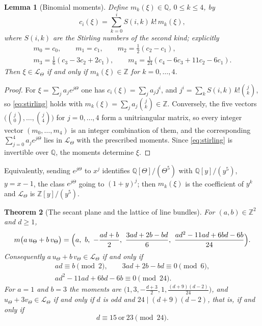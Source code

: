 \documentclass[11pt,reqno]{amsart}
\theoremstyle{plain}
\newtheorem{theorem}{Theorem}[section]
\newtheorem{lemma}[theorem]{Lemma}
\theoremstyle{definition}
\theoremstyle{remark}
\newcommand{\QQ}{\mathbb{Q}}
\newcommand{\ZZ}{\mathbb{Z}}
\newcommand{\cL}{\mathcal{L}}
\begin{document}
\begin{lemma}[Binomial moments]\label{lem:binomialmoments}
Define $m_{k}(\xi)\in\QQ$, $0\le k\le4$, by
\begin{equation}\label{eq:stirling}
  c_{i}(\xi)=\sum_{k=0}^{i}S(i,k)\,k!\,m_{k}(\xi),
\end{equation}
where $S(i,k)$ are the Stirling numbers of the second kind; explicitly
\begin{gather*}
  m_{0}=c_{0},\qquad m_{1}=c_{1},\qquad m_{2}=\tfrac12(c_{2}-c_{1}),\\
  m_{3}=\tfrac16(c_{3}-3c_{2}+2c_{1}),\qquad
  m_{4}=\tfrac1{24}(c_{4}-6c_{3}+11c_{2}-6c_{1}).
\end{gather*}
Then $\xi\in\cL_{\Theta}$ if and only if $m_{k}(\xi)\in\ZZ$ for $k=0,\dots,4$.
\end{lemma}

\begin{proof}
For $\xi=\sum_{j}a_{j}e^{j\Theta}$ one has $c_{i}(\xi)=\sum_{j}a_{j}j^{i}$,
and $j^{i}=\sum_{k}S(i,k)\,k!\binom{j}{k}$, so \eqref{eq:stirling} holds
with $m_{k}(\xi)=\sum_{j}a_{j}\binom{j}{k}\in\ZZ$. Conversely, the five
vectors $\bigl(\binom{j}{0},\dots,\binom{j}{4}\bigr)$ for $j=0,\dots,4$
form a unitriangular matrix, so every integer vector $(m_{0},\dots,m_{4})$
is an integer combination of them, and the corresponding
$\sum_{j=0}^{4}a_{j}e^{j\Theta}$ lies in $\cL_{\Theta}$ with the prescribed
moments. Since \eqref{eq:stirling} is invertible over $\QQ$, the moments
determine $\xi$.
\end{proof}

Equivalently, sending $e^{j\Theta}$ to $x^{j}$ identifies
$\QQ[\Theta]/(\Theta^{5})$ with $\QQ[y]/(y^{5})$, $y=x-1$, the class
$e^{j\Theta}$ going to $(1+y)^{j}$; then $m_{k}(\xi)$ is the coefficient of
$y^{k}$ and $\cL_{\Theta}$ is $\ZZ[y]/(y^{5})$.

\begin{theorem}[The secant plane and the lattice of line bundles]
\label{thm:lattice}
For $(a,b)\in\ZZ^{2}$ and $d\ge1$,
\[
  m\bigl(a\,u_{\Theta}+b\,v_{\Theta}\bigr)
  =\Bigl(a,\ b,\ -\frac{ad+b}{2},\ \frac{3ad+2b-bd}{6},\
  \frac{ad^{2}-11ad+6bd-6b}{24}\Bigr).
\]
Consequently $a\,u_{\Theta}+b\,v_{\Theta}\in\cL_{\Theta}$ if and only if
\begin{gather*}
  ad\equiv b\pmod 2,\qquad 3ad+2b-bd\equiv0\pmod 6,\\
  ad^{2}-11ad+6bd-6b\equiv0\pmod{24}.
\end{gather*}
For $a=1$ and $b=3$ the moments are
$\bigl(1,3,-\tfrac{d+3}{2},1,\tfrac{(d+9)(d-2)}{24}\bigr)$, and
$u_{\Theta}+3v_{\Theta}\in\cL_{\Theta}$ if and only if $d$ is odd and
$24\mid(d+9)(d-2)$, that is, if and only if
\[
  d\equiv15\ \text{or}\ 23\pmod{24}.
\]
\end{theorem}
\end{document}
